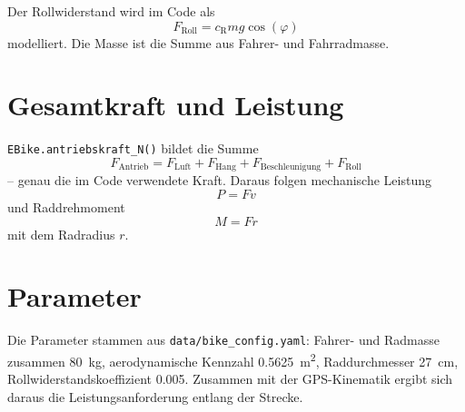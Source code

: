 Der Rollwiderstand wird im Code als
\begin{equation}
F_{\mathrm{Roll}} = c_{\mathrm{R}} m g \cos(\varphi)
\end{equation}
modelliert. Die Masse ist die Summe aus Fahrer- und Fahrradmasse.

\section{Gesamtkraft und Leistung}

\texttt{EBike.antriebskraft\_N()} bildet die Summe
\begin{equation}
F_{\mathrm{Antrieb}} = F_{\mathrm{Luft}} + F_{\mathrm{Hang}} + F_{\mathrm{Beschleunigung}} + F_{\mathrm{Roll}}
\end{equation}
-- genau die im Code verwendete Kraft. Daraus folgen mechanische Leistung
\begin{equation}
P = F v
\end{equation}
und Raddrehmoment
\begin{equation}
M = F r
\end{equation}
mit dem Radradius \(r\).

\section{Parameter}

Die Parameter stammen aus \texttt{data/bike\_config.yaml}: Fahrer- und Radmasse zusammen \SI{80}{\kilogram}, aerodynamische Kennzahl \SI{0.5625}{\square\metre}, Raddurchmesser \SI{27}{\centi\metre}, Rollwiderstandskoeffizient \num{0.005}. Zusammen mit der GPS-Kinematik ergibt sich daraus die Leistungsanforderung entlang der Strecke.

